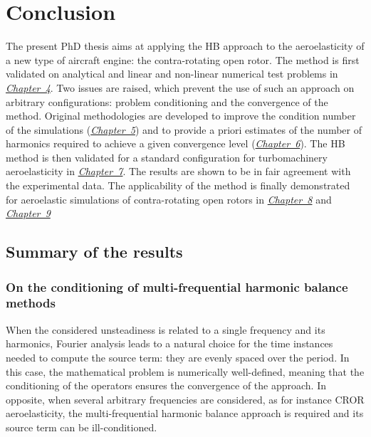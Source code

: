 
\chapter*{Conclusion}

The present PhD thesis aims at applying the HB approach to the 
aeroelasticity of a new type of aircraft engine: 
the contra-rotating open rotor. The method is 
first validated on analytical and linear and non-linear 
numerical test problems in \hyperref[cha:validation_hb]{\emph{Chapter~4}}. 
Two issues are raised, which prevent the use of such an approach 
on arbitrary configurations: problem conditioning and the
convergence of the method. Original methodologies are developed 
to improve the condition number of the simulations 
(\hyperref[cha:limitations_condition_number]{\emph{Chapter~5}})
and to provide a priori estimates of the number of harmonics 
required to achieve a given convergence level
(\hyperref[cha:limitations_convergence]{\emph{Chapter~6}}). 
The HB method is then validated for a standard configuration 
for turbomachinery aeroelasticity in \hyperref[cha:stcf11]{\emph{Chapter~7}}. 
The results are shown to be in fair agreement 
with the experimental data. The applicability of the method 
is finally demonstrated for aeroelastic 
simulations of contra-rotating open rotors
in \hyperref[cha:dream_ls_isolated]{\emph{Chapter~8}}
and \hyperref[cha:dream_hs_isolated]{\emph{Chapter~9}}

\section*{Summary of the results}

\subsection*{On the conditioning of multi-frequential harmonic balance methods}

When the considered unsteadiness is related to a single frequency and its
harmonics, Fourier analysis leads to a natural choice for the time instances
needed to compute the source term:
they are evenly spaced over the period. In this case, the mathematical
problem is numerically well-defined, meaning that the conditioning of
the operators ensures the convergence of the approach.
In opposite, when several arbitrary frequencies are 
considered, as for instance CROR
aeroelasticity, the multi-frequential harmonic balance approach
is required and its source term can be ill-conditioned.

